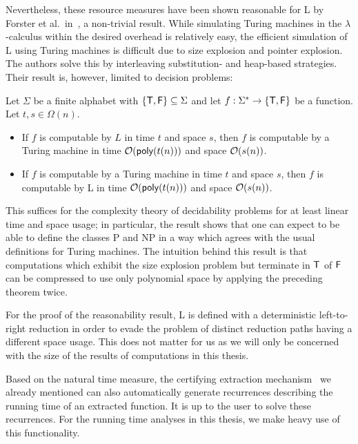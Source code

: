 Nevertheless, these resource measures have been shown reasonable for L by Forster et al.\ in~\cite{ForsterKunzeRoth:2019:wcbv-Reasonable}, a non-trivial result. While simulating Turing machines in the $\lambda$-calculus within the desired overhead is relatively easy, the efficient simulation of L using Turing machines is difficult due to size explosion and pointer explosion. The authors solve this by interleaving substitution- and heap-based strategies.
Their result is, however, limited to decision problems:
\begin{theorem}
  Let $\Sigma$ be a finite alphabet with $\{\mathsf{T}, \mathsf{F}\} \subseteq \Sigma$ and let $f : \Sigma^* \rightarrow \{\mathsf{T}, \mathsf{F}\}$ be a function. Let $t, s \in \Omega(n)$. 
  \begin{itemize}
    \item If $f$ is computable by $L$ in time $t$ and space $s$, then $f$ is computable by a Turing machine in time $\mathcal{O}{(\textsf{poly}(t(n)))}$ and space $\mathcal{O}{(s(n))}$.
    \item If $f$ is computable by a Turing machine in time $t$ and space $s$, then $f$ is computable by L in time $\mathcal{O}{(\textsf{poly}(t(n)))}$ and space $\mathcal{O}{(s(n))}$. 
  \end{itemize}
\end{theorem}
This suffices for the complexity theory of decidability problems for at least linear time and space usage; in particular, the result shows that one can expect to be able to define the classes \textsf{P} and \textsf{NP} in a way which agrees with the usual definitions for Turing machines. 
The intuition behind this result is that computations which exhibit the size explosion problem but terminate in $\mathsf{T}$ of $\mathsf{F}$ can be compressed to use only polynomial space by applying the preceding theorem twice.

\begin{remark}
  For the proof of the reasonability result, L is defined with a deterministic left-to-right reduction in order to evade the problem of distinct reduction paths having a different space usage. This does not matter for us as we will only be concerned with the size of the results of computations in this thesis.
\end{remark}

Based on the natural time measure, the certifying extraction mechanism~\cite{ForsterKunze:2019:Certifying-extraction} we already mentioned can also automatically generate recurrences describing the running time of an extracted function. It is up to the user to solve these recurrences.
For the running time analyses in this thesis, we make heavy use of this functionality.

